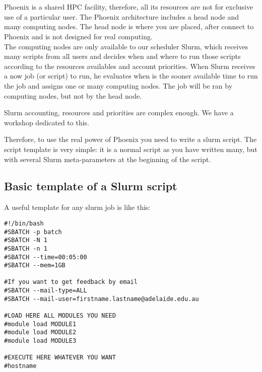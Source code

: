 
\chapter{\moduleTitle}
\newpage
Phoenix is a shared HPC facility, therefore, all its resources are not for exclusive use of a particular user.
The Phoenix architecture includes a head node and many computing nodes. The head node is where you are placed, after connect to Phoenix and is not designed for real computing. 
\\
The computing nodes are only available to our scheduler Slurm, which receives many scripts from all users and decides when and where to run those scripts according to the resources availables and account priorities.
When Slurm receives a now job (or script) to run, he evaluates when is the sooner available time to run the job and assigns one or many computing nodes.
The job will be ran by computing nodes, but not by the head node.  
\\
\begin{information}
	Slurm accounting, resources and priorities are complex enough. We have a workshop dedicated to this.
\end{information}
 
Therefore, to use the real power of Phoenix you need to write a slurm script. The script template is very simple: it is a normal script as you have written many, but with several Slurm meta-parameters at the beginning of the script.

\section{Basic template of a Slurm script}
A useful template for any slurm job is like this:
\begin{lstlisting}
#!/bin/bash
#SBATCH -p batch
#SBATCH -N 1
#SBATCH -n 1
#SBATCH --time=00:05:00
#SBATCH --mem=1GB

#If you want to get feedback by email
#SBATCH --mail-type=ALL
#SBATCH --mail-user=firstname.lastname@adelaide.edu.au

#LOAD HERE ALL MODULES YOU NEED
#module load MODULE1
#module load MODULE2
#module load MODULE3

#EXECUTE HERE WHATEVER YOU WANT
#hostname
\end{lstlisting}

